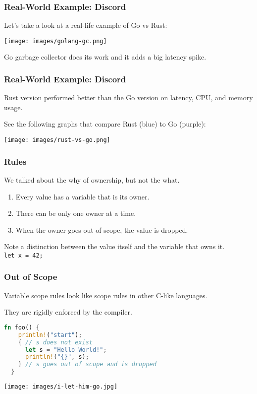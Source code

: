 \begin{frame}
\frametitle{Real-World Example: Discord}

Let's take a look at a real-life example of Go vs Rust:

\begin{center}
\texttt{[image: images/golang-gc.png]}
\end{center}

Go garbage collector does its work and it adds a big latency spike.


\end{frame}


\begin{frame}
\frametitle{Real-World Example: Discord}

Rust version performed better than the Go version on latency, CPU, and memory usage.

See the following graphs that compare Rust (blue) to Go (purple): 
\begin{center}
\texttt{[image: images/rust-vs-go.png]}
\end{center}

\end{frame}


\begin{frame}
\frametitle{Rules}

We talked about the why of ownership, but not the what.

\begin{enumerate}
	\item Every value has a variable that is its owner.
	\item There can be only one owner at a time.
	\item When the owner goes out of scope, the value is dropped.
\end{enumerate}

Note a distinction between the value itself and the variable that owns it.\\
\quad \texttt{let x = 42;}

\end{frame}


\begin{frame}[fragile]
\frametitle{Out of Scope}

Variable scope rules look like scope rules in other C-like languages.

They are rigidly enforced by the compiler.

\begin{lstlisting}[language=Rust]
  fn foo() {
    println!("start");
    { // s does not exist
      let s = "Hello World!";
      println!("{}", s);
    } // s goes out of scope and is dropped
  }
\end{lstlisting}


\begin{center}
	\texttt{[image: images/i-let-him-go.jpg]}
\end{center}

\end{frame}


